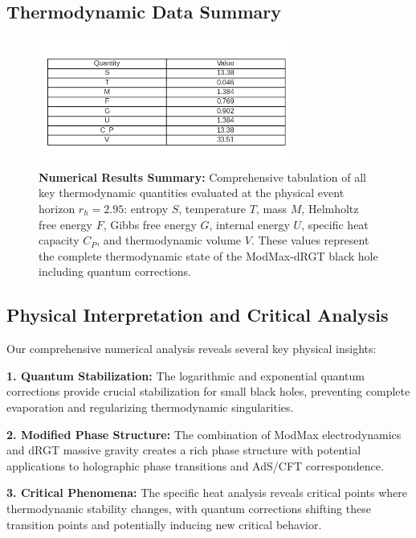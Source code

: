 \documentclass[12pt]{article}
\begin{document}
\subsection{Thermodynamic Data Summary}

\begin{figure}[H]
    \centering
    \includegraphics[width=0.75\textwidth]{figures/figure_4.png}
    \caption{\textbf{Numerical Results Summary:} Comprehensive tabulation of all key thermodynamic quantities evaluated at the physical event horizon $r_h = 2.95$: entropy $S$, temperature $T$, mass $M$, Helmholtz free energy $F$, Gibbs free energy $G$, internal energy $U$, specific heat capacity $C_P$, and thermodynamic volume $V$. These values represent the complete thermodynamic state of the ModMax-dRGT black hole including quantum corrections.}
    \label{fig:notebook_fig4}
\end{figure}

\subsection{Physical Interpretation and Critical Analysis}

Our comprehensive numerical analysis reveals several key physical insights:

\textbf{1. Quantum Stabilization:} The logarithmic and exponential quantum corrections provide crucial stabilization for small black holes, preventing complete evaporation and regularizing thermodynamic singularities.

\textbf{2. Modified Phase Structure:} The combination of ModMax electrodynamics and dRGT massive gravity creates a rich phase structure with potential applications to holographic phase transitions and AdS/CFT correspondence.

\textbf{3. Critical Phenomena:} The specific heat analysis reveals critical points where thermodynamic stability changes, with quantum corrections shifting these transition points and potentially inducing new critical behavior.
\end{document}

